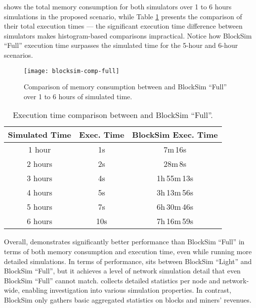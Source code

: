  shows the total memory consumption for both
simulators over 1 to 6 hours simulations in the proposed scenario, while Table
\ref{tab:comparison-full-time} presents the comparison of their total execution
times --- the significant execution time difference between simulators makes
histogram-based comparisons impractical. Notice how BlockSim ``Full'' execution
time surpasses the simulated time for the 5-hour and 6-hour scenarios.

\begin{figure}[tbhp]
	\centering
	\texttt{[image: blocksim-comp-full]}
	\caption{Comparison of memory consumption between \iblock{} and
	BlockSim ``Full'' over 1 to 6 hours of simulated
	time.}\label{fig:comparison-full-memory}
\end{figure}

\begin{table}[tbhp]
	\centering
	\begin{tabular}{|c|c|c|}
		\toprule
		Simulated Time & \iblock{} Exec\@. Time & BlockSim Exec\@. Time \\
		\midrule
		1 hour & 1s & 7m\,16s \\[6pt]
		2 hours & 2s & 28m\,8s \\[6pt]
		3 hours & 4s & 1h\,55m\,13s \\[6pt]
		4 hours & 5s & 3h\,13m\,56s \\[6pt]
		5 hours & 7s & 6h\,30m\,46s \\[6pt]
		6 hours & 10s & 7h\,16m\,59s \\
		\bottomrule
	\end{tabular}
	\caption{Execution time comparison between \iblock{} and BlockSim
	``Full''.}\label{tab:comparison-full-time}
\end{table}

Overall, \iblock{} demonstrates significantly better performance than BlockSim
``Full'' in terms of both memory consumption and execution time, even while
running more detailed simulations. In terms of performance, \iblock{} sits
between BlockSim ``Light'' and BlockSim ``Full'', but it achieves a level of
network simulation detail that even BlockSim ``Full'' cannot match. \iblock{}
collects detailed statistics per node and network-wide, enabling investigation
into various simulation properties. In contrast, BlockSim only gathers basic
aggregated statistics on blocks and miners' revenues.
